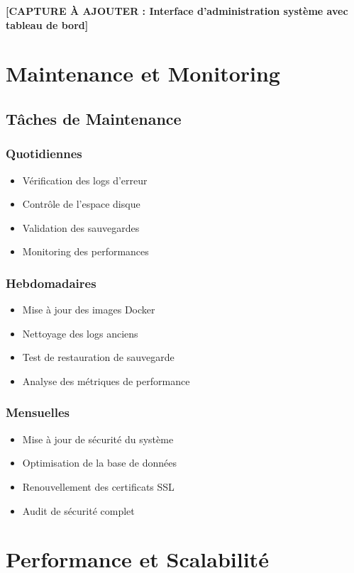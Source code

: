\textbf{[CAPTURE À AJOUTER : Interface d'administration système avec tableau de bord]}

\section{Maintenance et Monitoring}

\subsection{Tâches de Maintenance}

\subsubsection{Quotidiennes}
\begin{itemize}
    \item Vérification des logs d'erreur
    \item Contrôle de l'espace disque
    \item Validation des sauvegardes
    \item Monitoring des performances
\end{itemize}

\subsubsection{Hebdomadaires}
\begin{itemize}
    \item Mise à jour des images Docker
    \item Nettoyage des logs anciens
    \item Test de restauration de sauvegarde
    \item Analyse des métriques de performance
\end{itemize}

\subsubsection{Mensuelles}
\begin{itemize}
    \item Mise à jour de sécurité du système
    \item Optimisation de la base de données
    \item Renouvellement des certificats SSL
    \item Audit de sécurité complet
\end{itemize}

\section{Performance et Scalabilité}


